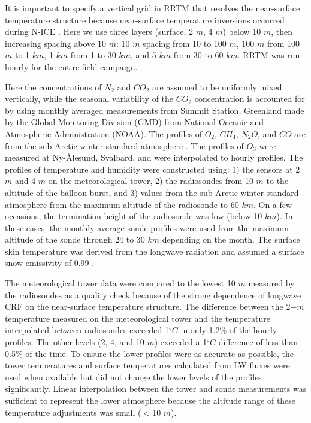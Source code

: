  It is important to specify a vertical grid in RRTM that resolves the near-surface temperature structure because near-surface temperature inversions occurred during N-ICE \citep{kayser:2017}. Here we use three layers (surface, 2 $m$, 4 $m$) below 10 $m$, then increasing spacing above 10 $m$: 10 $m$ spacing from 10 to 100 $m$, 100 $m$ from 100 $m$ to 1 $km$, 1 $km$ from 1 to 30 $km$, and 5 $km$ from 30 to 60 $km$. RRTM was run hourly for the entire field campaign.

Here the concentrations of $N_{2}$ and $CO_{2}$ are assumed to be uniformly mixed vertically, while the seasonal variability of the $CO_{2}$ concentration is accounted for by using monthly averaged measurements from Summit Station, Greenland made by the Global Monitoring Division (GMD) from National Oceanic and Atmospheric Administration (NOAA). The profiles of $O_{2}$, $CH_{4}$, $N_{2}O$, and $CO$ are from the sub-Arctic winter standard atmosphere \citep{mcclatchey:1972}. The profiles of $O_{3}$ were measured at Ny-\r{A}lesund, Svalbard, and were interpolated to hourly profiles. The profiles of temperature and humidity were constructed using: 1) the sensors at 2 $m$ and 4 $m$ on the meteorological tower, 2) the radiosondes from 10 $m$ to the altitude of the balloon burst, and 3) values from the sub-Arctic winter standard atmosphere from the maximum altitude of the radiosonde to 60 $km$. On a few occasions, the termination height of the radiosonde was low (below 10 $km$). In these cases, the monthly average sonde profiles were used from the maximum altitude of the sonde through 24 to 30 $km$ depending on the month. The surface skin temperature was derived from the longwave radiation \citep{walden:2017} and assumed a surface snow emissivity of 0.99 \citep{persson:2002, grenfell:1999}.

The meteorological tower data were compared to the lowest 10 $m$ measured by the radiosondes as a quality check because of the strong dependence of longwave CRF on the near-surface temperature structure. The difference between the 2$-m$ temperature measured on the meteorological tower and the temperature interpolated between radiosondes exceeded 1$^{\circ}C$ in only 1.2$\%$ of the hourly profiles. The other levels (2, 4, and 10 $m$) exceeded a 1$^{\circ}C$ difference of less than 0.5$\%$ of the time. To ensure the lower profiles were as accurate as possible, the tower temperatures and surface temperatures calculated from LW fluxes were used when available but did not change the lower levels of the profiles significantly. Linear interpolation between the tower and sonde measurements was sufficient to represent the lower atmosphere because the altitude range of these temperature adjustments was small ($<$10 $m$).

